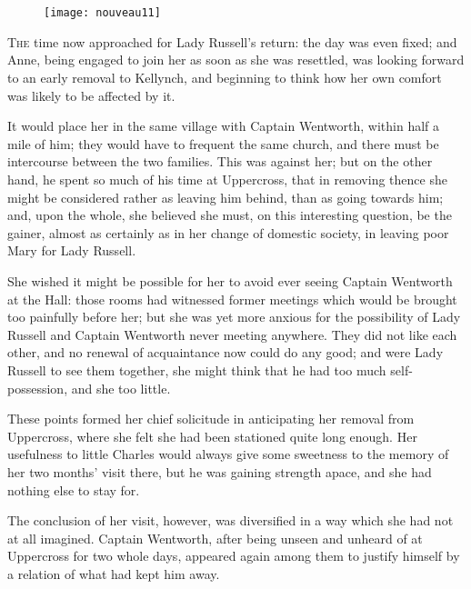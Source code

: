 \chapter[Chapter \thechapter]{}

\begin{figure}[t!]
\centering
\texttt{[image: nouveau11]}
\end{figure}

\lettrine[lraise=0.3]{T}{he} time now approached for Lady Russell's return: the day was even fixed; and Anne, being engaged to join her as soon as she was resettled, was looking forward to an early removal to Kellynch, and beginning to think how her own comfort was likely to be affected by it.

It would place her in the same village with Captain Wentworth, within half a mile of him; they would have to frequent the same church, and there must be intercourse between the two families. This was against her; but on the other hand, he spent so much of his time at Uppercross, that in removing thence she might be considered rather as leaving him behind, than as going towards him; and, upon the whole, she believed she must, on this interesting question, be the gainer, almost as certainly as in her change of domestic society, in leaving poor Mary for Lady Russell.

She wished it might be possible for her to avoid ever seeing Captain Wentworth at the Hall: those rooms had witnessed former meetings which would be brought too painfully before her; but she was yet more anxious for the possibility of Lady Russell and Captain Wentworth never meeting anywhere. They did not like each other, and no renewal of acquaintance now could do any good; and were Lady Russell to see them together, she might think that he had too much self-possession, and she too little.

These points formed her chief solicitude in anticipating her removal from Uppercross, where she felt she had been stationed quite long enough. Her usefulness to little Charles would always give some sweetness to the memory of her two months' visit there, but he was gaining strength apace, and she had nothing else to stay for.

The conclusion of her visit, however, was diversified in a way which she had not at all imagined. Captain Wentworth, after being unseen and unheard of at Uppercross for two whole days, appeared again among them to justify himself by a relation of what had kept him away.

